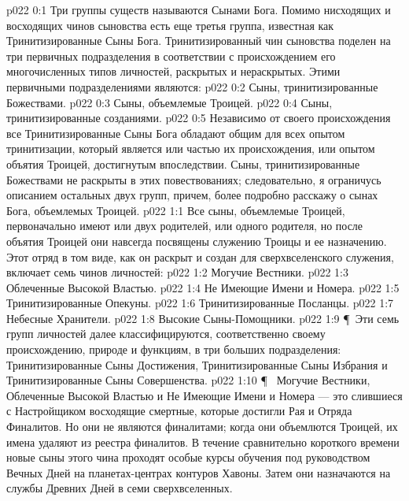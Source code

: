 \vs p022 0:1 Три группы существ называются Сынами Бога. Помимо нисходящих и восходящих чинов сыновства есть еще третья группа, известная как Тринитизированные Сыны Бога. Тринитизированный чин сыновства поделен на три первичных подразделения в соответствии с происхождением его многочисленных типов личностей, раскрытых и нераскрытых. Этими первичными подразделениями являются:
\vs p022 0:2 \bibnobreakspace Сыны, тринитизированные Божествами.
\vs p022 0:3 \bibnobreakspace Сыны, объемлемые Троицей.
\vs p022 0:4 \bibnobreakspace Сыны, тринитизированные созданиями.
\vs p022 0:5 Независимо от своего происхождения все Тринитизированные Сыны Бога обладают общим для всех опытом тринитизации, который является или частью их происхождения, или опытом объятия Троицей, достигнутым впоследствии. Сыны, тринитизированные Божествами не раскрыты в этих повествованиях; следовательно, я ограничусь описанием остальных двух групп, причем, более подробно расскажу о сынах Бога, объемлемых Троицей.
\vs p022 1:1 Все сыны, объемлемые Троицей, первоначально имеют или двух родителей, или одного родителя, но после объятия Троицей они навсегда посвящены служению Троицы и ее назначению. Этот отряд в том виде, как он раскрыт и создан для сверхвселенского служения, включает семь чинов личностей:
\vs p022 1:2 \bibnobreakspace Могучие Вестники.
\vs p022 1:3 \bibnobreakspace Облеченные Высокой Властью.
\vs p022 1:4 \bibnobreakspace Не Имеющие Имени и Номера.
\vs p022 1:5 \bibnobreakspace Тринитизированные Опекуны.
\vs p022 1:6 \bibnobreakspace Тринитизированные Посланцы.
\vs p022 1:7 \bibnobreakspace Небесные Хранители.
\vs p022 1:8 \bibnobreakspace Высокие Сыны\hyp{}Помощники.
\vs p022 1:9 \P\ Эти семь групп личностей далее классифицируются, соответственно своему происхождению, природе и функциям, в три больших подразделения: Тринитизированные Сыны Достижения, Тринитизированные Сыны Избрания и Тринитизированные Сыны Совершенства.
\vs p022 1:10 \P\  Могучие Вестники, Облеченные Высокой Властью и Не Имеющие Имени и Номера --- это слившиеся с Настройщиком восходящие смертные, которые достигли Рая и Отряда Финалитов. Но они не являются финалитами; когда они объемлются Троицей, их имена удаляют из реестра финалитов. В течение сравнительно короткого времени новые сыны этого чина проходят особые курсы обучения под руководством Вечных Дней на планетах\hyp{}центрах контуров Хавоны. Затем они назначаются на службы Древних Дней в семи сверхвселенных.
